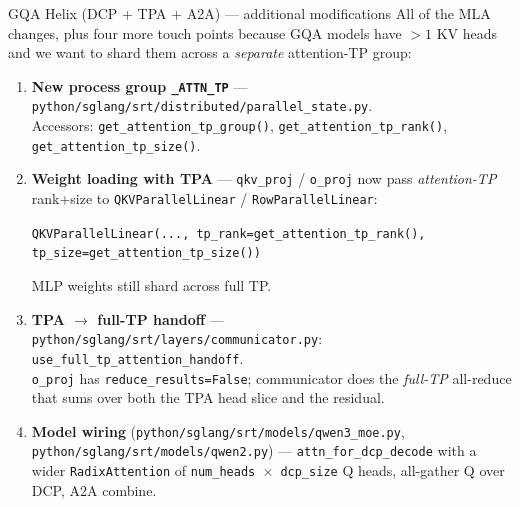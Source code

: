 \documentclass[aspectratio=169,10pt]{beamer}
\begin{document}
\begin{frame}{GQA Helix (DCP + TPA + A2A) --- additional modifications}
  \footnotesize
  All of the MLA changes, plus four more touch points because GQA models have $>1$ KV heads and
  we want to shard them across a \emph{separate} attention-TP group:

  \begin{enumerate}\itemsep3pt
    \item \textbf{New process group \texttt{\_ATTN\_TP}} --- \texttt{python/sglang/srt/distributed/parallel\_state.py}.\\
          Accessors: \texttt{get\_attention\_tp\_group()}, \texttt{get\_attention\_tp\_rank()},
          \texttt{get\_attention\_tp\_size()}.
    \item \textbf{Weight loading with TPA} --- \texttt{qkv\_proj} / \texttt{o\_proj} now pass \emph{attention-TP}
          rank+size to \texttt{QKVParallelLinear} / \texttt{RowParallelLinear}:
          \vspace{-0.05cm}
          \begin{center}\scriptsize
            \texttt{QKVParallelLinear(..., tp\_rank=get\_attention\_tp\_rank(),}
            \texttt{tp\_size=get\_attention\_tp\_size())}
          \end{center}
          MLP weights still shard across full TP.
    \item \textbf{TPA $\to$ full-TP handoff} --- \texttt{python/sglang/srt/layers/communicator.py}: \texttt{use\_full\_tp\_attention\_handoff}.\\
          \texttt{o\_proj} has \texttt{reduce\_results=False}; communicator does the \emph{full-TP} all-reduce
          that sums over both the TPA head slice and the residual.
    \item \textbf{Model wiring} (\texttt{python/sglang/srt/models/qwen3\_moe.py}, \texttt{python/sglang/srt/models/qwen2.py}) --- \texttt{attn\_for\_dcp\_decode} with a wider
          \texttt{RadixAttention} of \texttt{num\_heads $\times$ dcp\_size} Q heads, all-gather Q over DCP, A2A combine.
  \end{enumerate}
\end{frame}
\end{document}
